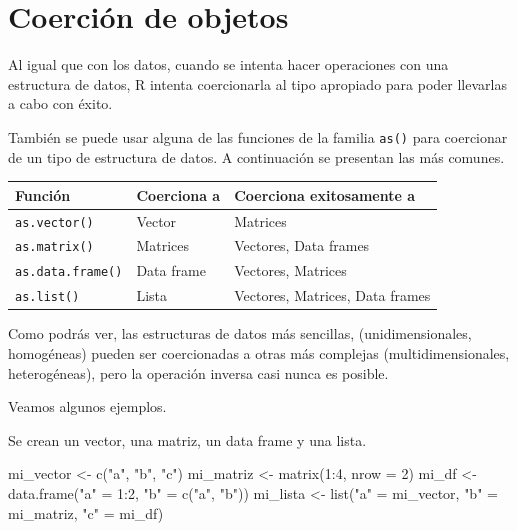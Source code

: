 \documentclass[
]{book}
\newenvironment{Shaded}{\begin{snugshade}}{\end{snugshade}}
\newcommand{\AttributeTok}[1]{\textcolor[rgb]{0.77,0.63,0.00}{#1}}
\newcommand{\DecValTok}[1]{\textcolor[rgb]{0.00,0.00,0.81}{#1}}
\newcommand{\FunctionTok}[1]{\textcolor[rgb]{0.00,0.00,0.00}{#1}}
\newcommand{\NormalTok}[1]{#1}
\newcommand{\OtherTok}[1]{\textcolor[rgb]{0.56,0.35,0.01}{#1}}
\newcommand{\SpecialCharTok}[1]{\textcolor[rgb]{0.00,0.00,0.00}{#1}}
\newcommand{\StringTok}[1]{\textcolor[rgb]{0.31,0.60,0.02}{#1}}
\begin{document}
\hypertarget{coerciuxf3n-de-objetos}{%
\chapter{Coerción de objetos}\label{coerciuxf3n-de-objetos}}

Al igual que con los datos, cuando se intenta hacer operaciones con una estructura de datos, R intenta coercionarla al tipo apropiado para poder llevarlas a cabo con éxito.

También se puede usar alguna de las funciones de la familia \texttt{as()} para coercionar de un tipo de estructura de datos. A continuación se presentan las más comunes.

\begin{longtable}[]{@{}lll@{}}
\toprule()
Función & Coerciona a & Coerciona exitosamente a \\
\midrule()
\endhead
\texttt{as.vector()} & Vector & Matrices \\
\texttt{as.matrix()} & Matrices & Vectores, Data frames \\
\texttt{as.data.frame()} & Data frame & Vectores, Matrices \\
\texttt{as.list()} & Lista & Vectores, Matrices, Data frames \\
\bottomrule()
\end{longtable}

Como podrás ver, las estructuras de datos más sencillas, (unidimensionales, homogéneas) pueden ser coercionadas a otras más complejas (multidimensionales, heterogéneas), pero la operación inversa casi nunca es posible.

Veamos algunos ejemplos.

Se crean un vector, una matriz, un data frame y una lista.

\begin{Shaded}
\begin{Highlighting}[]
\NormalTok{mi\_vector }\OtherTok{\textless{}{-}} \FunctionTok{c}\NormalTok{(}\StringTok{"a"}\NormalTok{, }\StringTok{"b"}\NormalTok{, }\StringTok{"c"}\NormalTok{)}
\NormalTok{mi\_matriz }\OtherTok{\textless{}{-}} \FunctionTok{matrix}\NormalTok{(}\DecValTok{1}\SpecialCharTok{:}\DecValTok{4}\NormalTok{, }\AttributeTok{nrow =} \DecValTok{2}\NormalTok{)}
\NormalTok{mi\_df }\OtherTok{\textless{}{-}} \FunctionTok{data.frame}\NormalTok{(}\StringTok{"a"} \OtherTok{=} \DecValTok{1}\SpecialCharTok{:}\DecValTok{2}\NormalTok{, }\StringTok{"b"} \OtherTok{=} \FunctionTok{c}\NormalTok{(}\StringTok{"a"}\NormalTok{, }\StringTok{"b"}\NormalTok{))}
\NormalTok{mi\_lista }\OtherTok{\textless{}{-}} \FunctionTok{list}\NormalTok{(}\StringTok{"a"} \OtherTok{=}\NormalTok{ mi\_vector, }\StringTok{"b"} \OtherTok{=}\NormalTok{ mi\_matriz, }\StringTok{"c"} \OtherTok{=}\NormalTok{ mi\_df)}
\end{Highlighting}
\end{Shaded}
\end{document}

